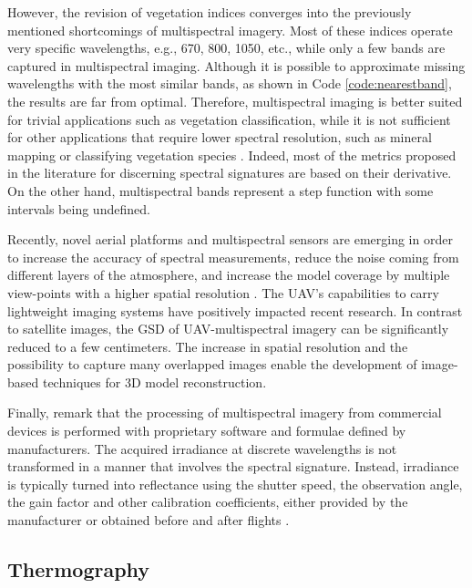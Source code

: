 However, the revision of vegetation indices converges into the previously mentioned shortcomings of multispectral imagery. Most of these indices operate very specific wavelengths, e.g., 670, 800, 1050, etc., while only a few bands are captured in multispectral imaging. Although it is possible to approximate missing wavelengths with the most similar bands, as shown in Code \ref{code:nearestband}, the results are far from optimal. Therefore, multispectral imaging is better suited for trivial applications such as vegetation classification, while it is not sufficient for other applications that require lower spectral resolution, such as mineral mapping or classifying vegetation species \cite{navulur_multispectral_2006, pu_hyperspectral_2017}. Indeed, most of the metrics proposed in the literature for discerning spectral signatures are based on their derivative. On the other hand, multispectral bands represent a step function with some intervals being undefined.



Recently, novel aerial platforms and multispectral sensors are emerging in order to increase the accuracy of spectral measurements, reduce the noise coming from different layers of the atmosphere, and increase the model coverage by multiple view-points with a higher spatial resolution \cite{deng_uav-based_2018}. The UAV’s capabilities to carry lightweight imaging systems have positively impacted recent research. In contrast to satellite images, the GSD of UAV-multispectral imagery can be significantly reduced to a few centimeters. The increase in spatial resolution and the possibility to capture many overlapped images enable the development of image-based techniques for 3D model reconstruction.

Finally, remark that the processing of multispectral imagery from commercial devices is performed with proprietary software and formulae defined by manufacturers. The acquired irradiance at discrete wavelengths is not transformed in a manner that involves the spectral signature. Instead, irradiance is typically turned into reflectance using the shutter speed, the observation angle, the gain factor and other calibration coefficients, either provided by the manufacturer or obtained before and after flights \cite{jurado_semantic_2020, candiago_evaluating_2015}.

\subsection{Thermography}
\label{sec:thermography_imaging}

